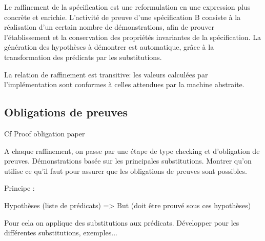 Le raffinement de la spécification est une reformulation en une
expression plus concrète et enrichie.
L'activité de preuve d'une spécification B consiste à la
réalisation d'un certain nombre de démonstrations, afin de prouver
l'établissement et la conservation des propriétés invariantes de la
spécification.
La génération des hypothèses à démontrer est automatique, grâce à la
transformation des prédicats par les substitutions.

La relation de raffinement est transitive: les valeurs calculées par
l'implémentation sont conformes à celles attendues par la machine
abstraite. 

\subsection{Obligations de preuves}
Cf Proof obligation paper

A chaque raffinement, on passe par une étape de type checking et
d'obligation de preuves. Démonstrations basée sur les principales
substitutions. Montrer qu'on utilise ce qu'il faut pour assurer que
les obligations de preuves sont possibles.

Principe :

Hypothèses (liste de prédicats)
=>
But (doit être prouvé sous ces hypothèses)

Pour cela on applique des substitutions aux prédicats. Développer pour les
différentes substitutions, exemples...

